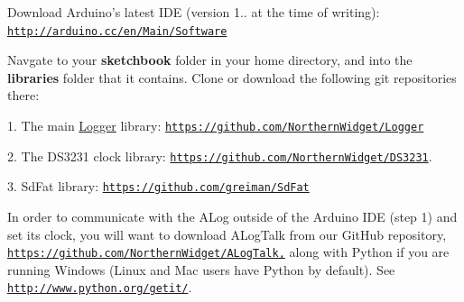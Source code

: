 \begin{DoxyEnumerate}
\item Download Arduino’s latest I\+DE (version 1.. at the time of writing)\+: \href{http://arduino.cc/en/Main/Software}{\tt http\+://arduino.\+cc/en/\+Main/\+Software}
\item Navgate to your {\bfseries sketchbook} folder in your home directory, and into the {\bfseries libraries} folder that it contains. Clone or download the following git repositories there\+:
\end{DoxyEnumerate}
\begin{DoxyEnumerate}
\item 1. The main \hyperlink{classLogger}{Logger} library\+: \href{https://github.com/NorthernWidget/Logger}{\tt https\+://github.\+com/\+Northern\+Widget/\+Logger}
\end{DoxyEnumerate}
\begin{DoxyEnumerate}
\item 2. The D\+S3231 clock library\+: \href{https://github.com/NorthernWidget/DS3231}{\tt https\+://github.\+com/\+Northern\+Widget/\+D\+S3231}.
\end{DoxyEnumerate}
\begin{DoxyEnumerate}
\item 3. Sd\+Fat library\+: \href{https://github.com/greiman/SdFat}{\tt https\+://github.\+com/greiman/\+Sd\+Fat}
\item In order to communicate with the A\+Log outside of the Arduino I\+DE (step 1) and set its clock, you will want to download A\+Log\+Talk from our Git\+Hub repository, \href{https://github.com/NorthernWidget/ALogTalk,}{\tt https\+://github.\+com/\+Northern\+Widget/\+A\+Log\+Talk,} along with Python if you are running Windows (Linux and Mac users have Python by default). See \href{http://www.python.org/getit/}{\tt http\+://www.\+python.\+org/getit/}.
\end{DoxyEnumerate}


